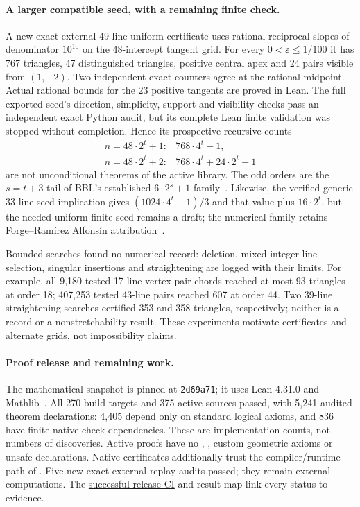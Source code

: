 \paragraph{A larger compatible seed, with a remaining finite check.}
A new exact external 49-line uniform certificate uses rational reciprocal slopes of denominator $10^{10}$ on the 48-intercept tangent grid. For every $0<\varepsilon\le1/100$ it has 767 triangles, 47 distinguished triangles, positive central apex and 24 pairs visible from $(1,-2)$. Two independent exact counters agree at the rational midpoint. Actual rational bounds for the 23 positive tangents are proved in Lean. The full exported seed's direction, simplicity, support and visibility checks pass an independent exact Python audit, but its complete Lean finite validation was stopped without completion. Hence its prospective recursive counts
\begin{equation}\label{j:exact49}
 \begin{array}{ll}
 n=48\cdot2^t+1:&768\cdot4^t-1,\\
 n=48\cdot2^t+2:&768\cdot4^t+24\cdot2^t-1
 \end{array}
\end{equation}
are not unconditional theorems of the active library. The odd orders are the $s=t+3$ tail of BBL's established $6\cdot2^s+1$ family~\cite{bbl2008}. Likewise, the verified generic 33-line-seed implication gives $(1024\cdot4^t-1)/3$ and that value plus $16\cdot2^t$, but the needed uniform finite seed remains a draft; the numerical family retains Forge--Ram\'irez Alfons\'in attribution~\cite{forge1998}.

Bounded searches found no numerical record: deletion, mixed-integer line selection, singular insertions and straightening are logged with their limits. For example, all 9,180 tested 17-line vertex-pair chords reached at most 93 triangles at order 18; 407,253 tested 43-line pairs reached 607 at order 44. Two 39-line straightening searches certified 353 and 358 triangles, respectively; neither is a record or a nonstretchability result. These experiments motivate certificates and alternate grids, not impossibility claims.

\paragraph{Proof release and remaining work.}
The mathematical snapshot is pinned at \texttt{2d69a71}; it uses Lean 4.31.0 and Mathlib~\cite{lean4,mathlib}. All 270 build targets and 375 active sources passed, with 5,241 audited theorem declarations: 4,405 depend only on standard logical axioms, and 836 have finite native-check dependencies. These are implementation counts, not numbers of discoveries. Active proofs have no , , custom geometric axioms or unsafe declarations. Native certificates additionally trust the compiler/runtime path of . Five new exact external replay audits passed; they remain external computations. The \href{https://github.com/alejandrozu/kobon-proof/actions/runs/37056093885}{successful release CI} and result map link every status to evidence.

